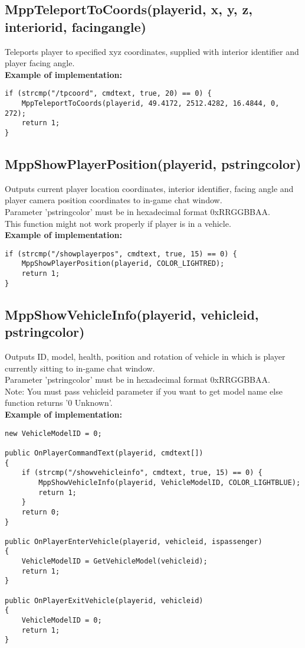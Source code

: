 \documentclass{article}
\begin{document}
\subsection{MppTeleportToCoords(playerid, x, y, z, interiorid, facingangle)}
Teleports player to specified xyz coordinates, supplied with interior identifier and player facing angle.
\bigskip
\\\textbf{Example of implementation:}
\begin{verbatim}
if (strcmp("/tpcoord", cmdtext, true, 20) == 0) {
    MppTeleportToCoords(playerid, 49.4172, 2512.4282, 16.4844, 0, 272);
    return 1;
}
\end{verbatim}


\newpage
\subsection{MppShowPlayerPosition(playerid, pstringcolor)}
Outputs current player location coordinates, interior identifier, facing angle and player camera position coordinates to in-game chat window.
\\Parameter 'pstringcolor' must be in hexadecimal format 0xRRGGBBAA.
\\This function might not work properly if player is in a vehicle.
\bigskip
\\\textbf{Example of implementation:}
\begin{verbatim}
if (strcmp("/showplayerpos", cmdtext, true, 15) == 0) {
    MppShowPlayerPosition(playerid, COLOR_LIGHTRED);
    return 1;
}
\end{verbatim}


\subsection{MppShowVehicleInfo(playerid, vehicleid, pstringcolor)}
Outputs ID, model, health, position and rotation of vehicle in which is player currently sitting to in-game chat window.
\\Parameter 'pstringcolor' must be in hexadecimal format 0xRRGGBBAA.
\\Note: You must pass vehicleid parameter if you want to get model name else function returns '0 Unknown'.
\bigskip
\\\textbf{Example of implementation:}
\begin{verbatim}
new VehicleModelID = 0;

public OnPlayerCommandText(playerid, cmdtext[])
{
    if (strcmp("/showvehicleinfo", cmdtext, true, 15) == 0) {
        MppShowVehicleInfo(playerid, VehicleModelID, COLOR_LIGHTBLUE);
        return 1;
    }
    return 0;
}

public OnPlayerEnterVehicle(playerid, vehicleid, ispassenger)
{
    VehicleModelID = GetVehicleModel(vehicleid);
    return 1;
}

public OnPlayerExitVehicle(playerid, vehicleid)
{
    VehicleModelID = 0;
    return 1;
}
\end{verbatim}
\end{document}
